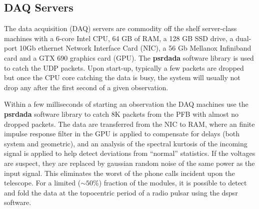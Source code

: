 \subsection {DAQ Servers}

The data acquisition (DAQ) servers are commodity off the shelf server-class machines with a 6-core Intel CPU, 64 GB of RAM, a 128 GB SSD drive, a dual-port 10Gb ethernet Network Interface Card (NIC), a 56 Gb Mellanox Infiniband card and a GTX 690 graphics card (GPU). The {\bf psrdada} software library is used to catch the UDP packets. Upon start-up, typically a few packets are dropped but once the CPU core catching the data is busy, the system will usually not drop any after the first second of a given observation. 

Within a few milliseconds of starting an observation the DAQ machines use the {\bf psrdada} software library to catch 8K packets from the PFB with almost no dropped packets. The data are transferred from the NIC to RAM, where an finite impulse response filter in the GPU is applied to compensate for delays (both system and geometric), and an analysis of the spectral kurtosis of the incoming signal is applied to help detect deviations from ``normal'' statistics. If the voltages are suspect, they are replaced by gaussian random noise of the same power as the input signal. This eliminates the worst of the phone calls incident upon the telescope. For a limited ($\sim50$\%) fraction of the modules, it is possible to detect and fold the data at the topocentric period of a radio pulsar using the {\sc dspsr} software.